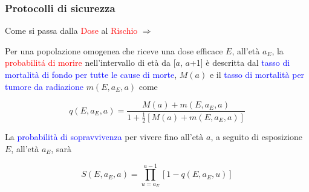 \documentclass[9pt]{beamer}
\begin{document}
\begin{frame} [fragile]
	\frametitle{Protocolli di sicurezza}
	\begin{block}{}
	\center
Come si passa dalla \textcolor{red}{Dose} al \textcolor{red}{Rischio}  $\Longrightarrow$ 
\end{block}

\small
Per una popolazione omogenea che riceve una dose efficace $E$, all'et\`a $a_{E}$, la \textcolor{red}{probabilit\'a di morire} nell'intervallo di et\`a da [$a$, $a$+1] \`e descritta dal \textcolor{blue}{tasso di mortalit\`a di fondo per tutte le cause di morte}, $M(a)$ e il \textcolor{blue}{tasso di mortalit\`a per tumore da radiazione} $m(E,a_{E}, a)$ come

\begin{equation*}
q(E, a_{E}, a) = \frac{M(a) + m(E, a_{E}, a)}{1 + \frac{1}{2}[M(a) + m(E, a_{E}, a)]}
\end{equation*}
\newline

La \textcolor{blue}{probabilit\`a di sopravvivenza} per vivere fino all'et\`a $a$, a seguito di esposizione $E$, all'et\`a $a_{E}$, sar\`a

\begin{equation*}
S(E, a_{E}, a) = \prod\limits_{u=a_{E}}^{a-1} [1-q(E,a_{E},u)]
\end{equation*}

\end{frame}
	
\end{document}
